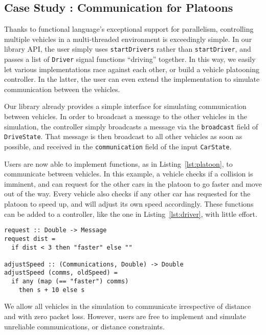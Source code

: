 \subsection{Case Study : Communication for Platoons}

Thanks to functional language's exceptional support for parallelism, controlling multiple vehicles in a multi-threaded environment is exceedingly simple. 
In our library API, the user simply uses \texttt{startDrivers} rather than \texttt{startDriver}, and passes a list of \texttt{Driver} signal functions ``driving'' together.
In this way, we easily let various implementations race against each other, or build a vehicle platooning controller.
In the latter, the user can even extend the implementation to simulate communication between the vehicles.

Our library already provides a simple interface for simulating communication between vehicles.
In order to broadcast a message to the other vehicles in the simulation, the controller simply broadcasts a message via the \texttt{broadcast} field of \texttt{DriveState}.
That message is then broadcast to all other vehicles as soon as possible, and received in the \texttt{communication} field of the input \texttt{CarState}.

Users are now able to implement functions, as in Listing~\ref{lst:platoon}, to communicate between vehicles.
In this example, a vehicle checks if a collision is imminent, and can request for the other cars in the platoon to go faster and move out of the way.
Every vehicle also checks if any other car has requested for the platoon to speed up, and will adjust its own speed accordingly.
These functions can be added to a controller, like the one in Listing~\ref{lst:driver}, with little effort.
\begin{lstlisting}[float,floatplacement=T,caption=Communicating between controllers, label=lst:platoon]
request :: Double -> Message
request dist = 
  if dist < 3 then "faster" else ""

adjustSpeed :: (Communications, Double) -> Double
adjustSpeed (comms, oldSpeed) =
  if any (map (== "faster") comms)
    then s + 10 else s
\end{lstlisting}

We allow all vehicles in the simulation to communicate irrespective of distance and with zero packet loss.
However, users are free to implement and simulate unreliable communications, or distance constraints.  

